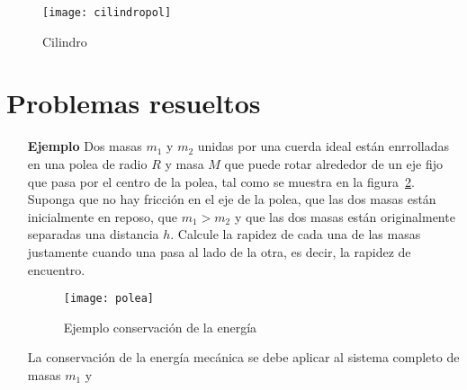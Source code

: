 \begin{figure}
  \centering
  \texttt{[image: cilindropol]}
  \caption{Cilindro}
  \label{fig:cilindropol}
\end{figure}

\section{Problemas resueltos}

\begin{itemize}
\item[\textbf{Ejemplo}] Dos masas $m_1$ y $m_2$ unidas por una cuerda ideal están enrrolladas en una polea de radio $R$ y masa $M$ que puede rotar alrededor de un eje fijo que pasa por el centro de la polea, tal como se muestra en la figura~\ref{fig:polea}. Suponga que no hay fricción en el eje de la polea, que las dos masas están inicialmente en reposo, que $m_1 > m_2$ y que las dos masas están originalmente separadas una distancia $h$. Calcule la rapidez de cada una de las masas justamente cuando una pasa al lado de la otra, es decir, la rapidez de encuentro.

  \begin{figure}
    \centering
    \texttt{[image: polea]}
    \caption{Ejemplo conservación de la energía}
    \label{fig:polea}
  \end{figure}
La conservación de la energía mecánica se debe aplicar al sistema completo de masas $m_1$ y 
\end{itemize}



